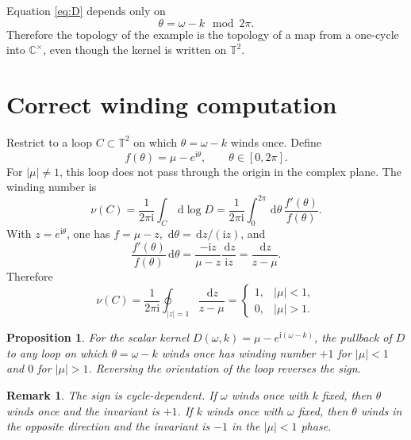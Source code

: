 \documentclass[11pt]{article}
\newtheorem{proposition}{Proposition}
\newtheorem{remark}{Remark}
\newcommand{\dd}{\,\mathrm{d}}
\newcommand{\ii}{\mathrm{i}}
\newcommand{\TT}{\mathbb{T}}
\newcommand{\CC}{\mathbb{C}}
\begin{document}
Equation \eqref{eq:D} depends only on
\begin{equation}
  \theta=\omega-k \mod 2\pi.
\end{equation}
Therefore the topology of the example is the topology of a map from a one-cycle into \(\CC^\times\), even though the kernel is written on \(\TT^2\).

\section{Correct winding computation}

Restrict to a loop \(C\subset\TT^2\) on which \(\theta=\omega-k\) winds once.  Define
\begin{equation}
  f(\theta)=\mu-e^{\ii\theta},
  \qquad \theta\in[0,2\pi].
\end{equation}
For \(|\mu|\neq1\), this loop does not pass through the origin in the complex plane.  The winding number is
\begin{equation}
  \nu(C)=\frac{1}{2\pi\ii}\int_C \dd\log D
       =\frac{1}{2\pi\ii}\int_0^{2\pi}\dd\theta\,\frac{f'(\theta)}{f(\theta)}.
  \label{eq:winding}
\end{equation}
With \(z=e^{\ii\theta}\), one has \(f=\mu-z\), \(\dd\theta=\dd z/(\ii z)\), and
\begin{equation}
  \frac{f'(\theta)}{f(\theta)}\dd\theta
  =\frac{-\ii z}{\mu-z}\frac{\dd z}{\ii z}
  =\frac{\dd z}{z-\mu}.
\end{equation}
Therefore
\begin{equation}
  \nu(C)=\frac{1}{2\pi\ii}\oint_{|z|=1}\frac{\dd z}{z-\mu}
  =
  \begin{cases}
    1, & |\mu|<1,\\[2pt]
    0, & |\mu|>1.
  \end{cases}
\end{equation}

\begin{proposition}
For the scalar kernel \(D(\omega,k)=\mu-e^{\ii(\omega-k)}\), the pullback of \(D\) to any loop on which \(\theta=\omega-k\) winds once has winding number \(+1\) for \(|\mu|<1\) and \(0\) for \(|\mu|>1\).  Reversing the orientation of the loop reverses the sign.
\end{proposition}

\begin{remark}
The sign is cycle-dependent.  If \(\omega\) winds once with \(k\) fixed, then \(\theta\) winds once and the invariant is \(+1\).  If \(k\) winds once with \(\omega\) fixed, then \(\theta\) winds in the opposite direction and the invariant is \(-1\) in the \(|\mu|<1\) phase.
\end{remark}
\end{document}
